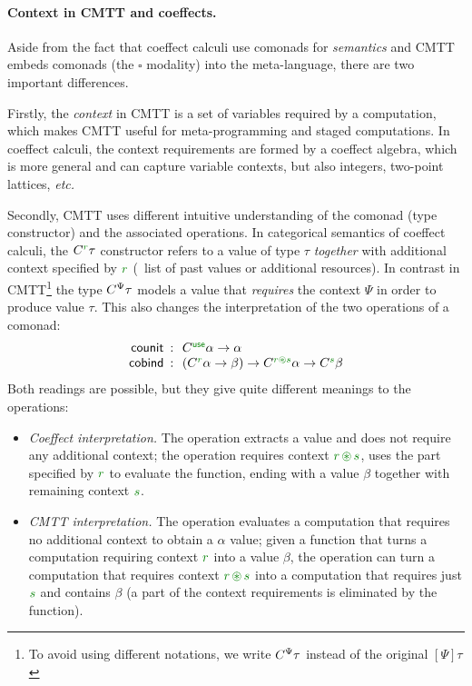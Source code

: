 \paragraph{Context in CMTT and coeffects.}
Aside from the fact that coeffect calculi use comonads for \emph{semantics} and CMTT embeds
comonads (the $\square$ modality) into the meta-language, there are two important differences.

Firstly, the \emph{context} in CMTT is a set of variables required by a computation, which
makes CMTT useful for meta-programming and staged computations. In coeffect calculi, the context
requirements are formed by a coeffect algebra, which is more general and can capture
variable contexts, but also integers, two-point lattices, \emph{etc.}

Secondly, CMTT uses different intuitive understanding of the comonad (type constructor) and
the associated operations. In categorical semantics of coeffect calculi, the $\ctyp{\cclrd{r}}{\tau}$
constructor refers to a value of type $\tau$ \emph{together} with additional context specified
by $\cclrd{r}$ (\eg~list of past values or additional resources). In contrast in 
CMTT\footnote{To avoid using different notations, we write $C^{\Psi}\tau$ instead of the 
original $[\Psi]{\tau}$} the type $C^{\Psi}\tau$ models a value that \emph{requires} the 
context $\Psi$ in order to produce value $\tau$. This also changes the interpretation of the 
two operations of a comonad:
\begin{equation*}
\begin{array}{rcl}
 \ident{counit} &\narrow{:}& \ctyp{\cunit}{\alpha} \rightarrow \alpha\\
 \ident{cobind} &\narrow{:}& (\ctyp{\cclrd{r}}{\alpha} \rightarrow \beta) \rightarrow 
    \ctyp{\cclrd{r}\cseq\cclrd{s}}{\alpha} \rightarrow \ctyp{\cclrd{s}}{\beta}
\end{array}
\end{equation*}
Both readings are possible, but they give quite different meanings to the operations:

\begin{itemize}
\item \emph{Coeffect interpretation.} The  operation extracts a value 
  and does not require any additional context; the  operation requires
  context $\cclrd{r}\,\cseq\,\cclrd{s}$, uses the part specified by $\cclrd{r}$ to 
  evaluate the function, ending with a value $\beta$ together with remaining context
  $\cclrd{s}$.
\item \emph{CMTT interpretation.} The  operation evaluates a computation 
  that requires no additional context to obtain a $\alpha$ value; given a function that
  turns a computation requiring context $\cclrd{r}$ into a value $\beta$, the 
  operation can turn a computation that requires context $\cclrd{r}\,\cseq\,\cclrd{s}$ 
  into a computation that requires just $\cclrd{s}$ and contains $\beta$ (a part of the
  context requirements is eliminated by the function).
\end{itemize}

